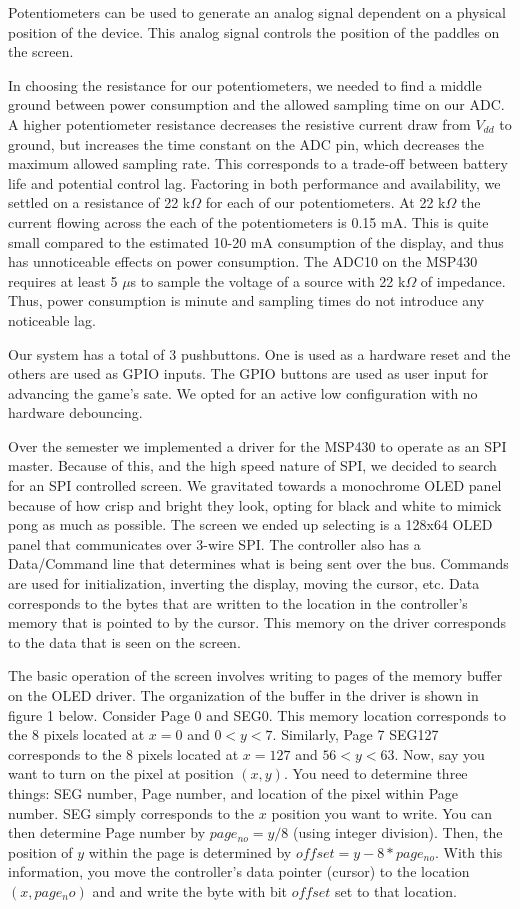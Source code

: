 \documentclass{article}
\begin{document}
Potentiometers can be used to generate an analog signal dependent on a physical position of the device. This analog signal controls the position of the paddles on the screen.

In choosing the resistance for our potentiometers, we needed to find a middle ground between power consumption and the allowed sampling time
on our ADC. A higher potentiometer resistance decreases the resistive current draw from $V_{dd}$ to ground, but increases the time constant on the ADC pin, which decreases the maximum allowed sampling rate. This corresponds to a trade-off between battery life and potential control lag.
Factoring in both performance and availability, we settled on a resistance of 22 k$\Omega$ for each of our potentiometers. At 22 k$\Omega$ the current flowing across the each of the potentiometers is 0.15 mA. This is quite small compared to the estimated 10-20 mA consumption of the display, and thus has unnoticeable effects on power consumption. The ADC10 on the MSP430 requires at least 5 $\mu$s to sample the voltage of a source with 22 k$\Omega$ of impedance.
Thus, power consumption is minute and sampling times do not introduce any noticeable lag.

Our system has a total of 3 pushbuttons. One is used as a hardware reset and the others are used as GPIO inputs. The GPIO buttons are used as user input for advancing the game's sate. We opted for an active low configuration with no hardware debouncing.


Over the semester we implemented a driver for the MSP430 to operate as an SPI master. Because of this, and the high speed nature of SPI, we decided to search for an SPI controlled screen. We gravitated towards a monochrome OLED panel because of how crisp and bright they look, opting for black and white to mimick pong as much as possible. The screen we ended up selecting is a 128x64 OLED panel that communicates over 3-wire SPI. The controller also has a Data/Command line that determines what is being sent over the bus. Commands are used for initialization, inverting the display, moving the cursor, etc. Data corresponds to the bytes that are written to the location in the controller's memory that is pointed to by the cursor. This memory on the driver corresponds to the data that is seen on the screen.

The basic operation of the screen involves writing to pages of the memory buffer on the OLED driver. The organization of the buffer in the driver is shown in figure 1 below. Consider Page 0 and SEG0. This memory location corresponds to the 8 pixels located at $x=0$ and $0<y<7$. Similarly, Page 7 SEG127 corresponds to the 8 pixels located at $x=127$ and $56<y<63$. Now, say you want to turn on the pixel at position $(x,y)$. You need to determine three things: SEG number, Page number, and location of the pixel within Page number.
SEG simply corresponds to the $x$ position you want to write. You can then determine Page number by $page_{no} = y/8$ (using integer division). Then, the position of $y$ within the page is determined by $offset = y-8*page_{no}$. With this information, you move the controller's data pointer (cursor) to the location $(x, page_no)$ and and write the byte with bit $offset$ set to that location.
\end{document}
